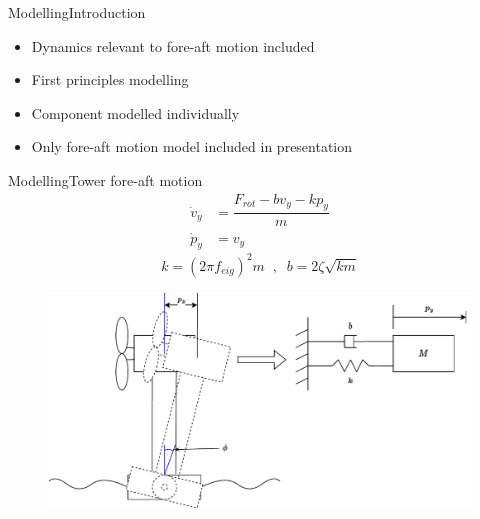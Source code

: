 \begin{frame}{Modelling}{Introduction}
	\begin{itemize}
		\item Dynamics relevant to fore-aft motion included
		\item First principles modelling
		\item Component modelled individually
		\item Only fore-aft motion model included in presentation
	\end{itemize}
\end{frame}


\begin{frame}{Modelling}{Tower fore-aft motion}
	\begin{equation}
		\begin{split}
			\dot{v}_y & = \dfrac{F_{rot} - b v_y - k p_y}{m} \\
			\dot{p}_y & = v_y
		\end{split}
	\end{equation}
	\begin{equation}
			k = (2 \pi f_{eig})^2 m \;\; , \;\; b = 2 \zeta \sqrt{k m}
	\end{equation}
	\begin{figure}[ht]
		\centering
		\includegraphics[width=0.9\linewidth]{../Graphics/wtLinForeAftMotionModel.pdf}
		\label{fig:wtLin_fore-aft_diagram}
	\end{figure}
\end{frame}


